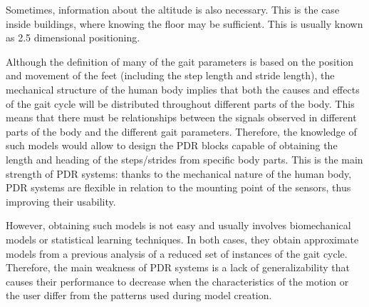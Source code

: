 Sometimes, information about the altitude is also necessary. This is the case inside buildings, where knowing the floor may be sufficient. This is usually known as 2.5 dimensional positioning.



Although the definition of many of the gait parameters is based on the position and movement of the feet (including the step length and stride length), the mechanical structure of the human body implies that both the causes and effects of the gait cycle will be distributed throughout different parts of the body.
This means that there must be relationships between the signals observed in different parts of the body and the different gait parameters.
Therefore, the knowledge of such models would allow to design the PDR blocks capable of obtaining the length and heading of the steps/strides from specific body parts.
This is the main strength of PDR systems: thanks to the mechanical nature of the human body, PDR systems are flexible in relation to the mounting point of the sensors, thus improving their usability.

However, obtaining such models is not easy and usually involves biomechanical models or statistical learning techniques. 
In both cases, they obtain approximate models from a previous analysis of a reduced set of instances of the gait cycle.
Therefore, the main weakness of PDR systems is a lack of generalizability that causes their performance to decrease when the characteristics of the motion or the user differ from the patterns used during model creation.

